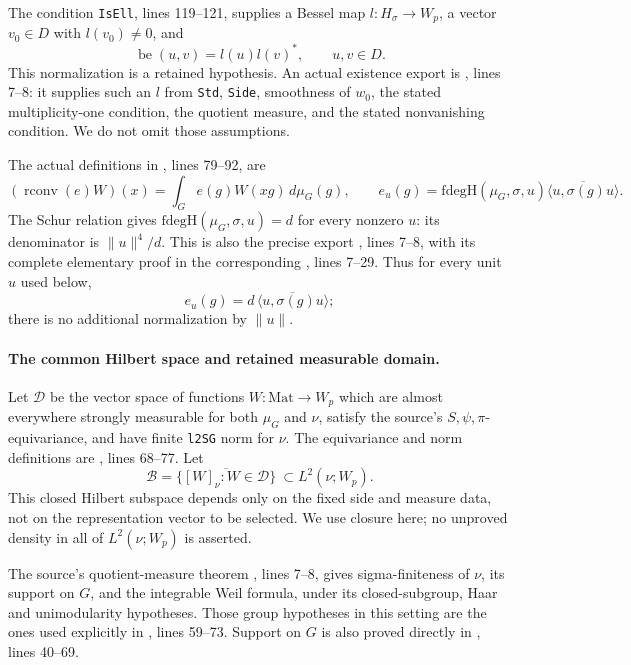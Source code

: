 The condition \texttt{IsEll}, lines 119--121, supplies a Bessel map
\(l:H_\sigma\to W_p\), a vector \(v_0\in D\) with \(l(v_0)\ne0\),
and
\[
 \operatorname{be}(u,v)=l(u)l(v)^*,\qquad u,v\in D.
\]
This normalization is a retained hypothesis. An actual existence
export is
,
lines 7--8: it supplies such an \(l\) from \texttt{Std},
\texttt{Side}, smoothness of \(w_0\), the stated multiplicity-one
condition, the quotient measure, and the stated nonvanishing
condition. We do not omit those assumptions.

The actual definitions in
, lines 79--92,
are
\[
 (\operatorname{rconv}(e)W)(x)
 =\int_G e(g)W(xg)\,d\mu_G(g),\qquad
 e_u(g)=\mathrm{fdegH}(\mu_G,\sigma,u)
             \overline{\langle u,\sigma(g)u\rangle}.
\]
The Schur relation gives
\(\mathrm{fdegH}(\mu_G,\sigma,u)=d\) for every nonzero \(u\):
its denominator is \(\|u\|^4/d\).
This is also the precise export
,
lines 7--8, with its complete elementary proof in the corresponding
, lines 7--29.
Thus for every unit \(u\) used below,
\[
 e_u(g)=d\,\overline{\langle u,\sigma(g)u\rangle};
\]
there is no additional normalization by \(\|u\|\).

\paragraph{The common Hilbert space and retained measurable domain.}
Let \(\mathcal D\) be the vector space of functions
\(W:\mathrm{Mat}\to W_p\) which are almost everywhere strongly
measurable for both \(\mu_G\) and \(\nu\), satisfy the source's
\(S,\psi,\pi\)-equivariance, and have finite \texttt{l2SG} norm
for \(\nu\). The equivariance and norm definitions are
, lines 68--77.
Let
\[
 \mathcal B=\overline{\{[W]_\nu:W\in\mathcal D\}}
       \ \subset L^2(\nu;W_p).
\]
This closed Hilbert subspace depends only on the fixed side and
measure data, not on the representation vector to be selected.
We use closure here; no unproved density in all of \(L^2(\nu;W_p)\)
is asserted.

The source's quotient-measure theorem
,
lines 7--8, gives sigma-finiteness of \(\nu\), its support on \(G\),
and the integrable Weil formula, under its closed-subgroup,
Haar and unimodularity hypotheses. Those group hypotheses in
this setting are the ones used explicitly in
, lines 59--73.
Support on \(G\) is also proved directly in
, lines 40--69.

